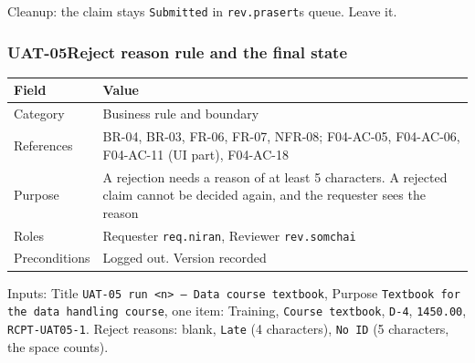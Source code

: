 Cleanup: the claim stays \texttt{Submitted} in \texttt{rev.prasert}\textquotesingle s queue. Leave it.

\subsubsection*{UAT-05\enspace Reject reason rule and the final state}\label{case:UAT-05}

{\def\LTcaptype{none} %
\begin{longtable}[]{@{}
  >{\raggedright\arraybackslash}p{}
  >{\raggedright\arraybackslash}p{}@{}}
\toprule\noalign{}
\begin{minipage}[b]{\linewidth}\raggedright
Field
\end{minipage} & \begin{minipage}[b]{\linewidth}\raggedright
Value
\end{minipage} \\
\midrule\noalign{}
\endhead
\bottomrule\noalign{}
\endlastfoot
Category & Business rule and boundary \\
References & BR-04, BR-03, FR-06, FR-07, NFR-08; F04-AC-05, F04-AC-06, F04-AC-11 (UI part), F04-AC-18 \\
Purpose & A rejection needs a reason of at least 5 characters. A rejected claim cannot be decided again, and the requester sees the reason \\
Roles & Requester \texttt{req.niran}, Reviewer \texttt{rev.somchai} \\
Preconditions & Logged out. Version recorded \\
\end{longtable}
}

Inputs: Title \texttt{UAT-05\ run\ \textless{}n\textgreater{}\ –\ Data\ course\ textbook}, Purpose \texttt{Textbook for the data handling course}, one item: Training, \texttt{Course textbook}, \texttt{D-4}, \texttt{1450.00}, \texttt{RCPT-UAT05-1}. Reject reasons: blank, \texttt{Late} (4 characters), \texttt{No ID} (5 characters, the space counts).

